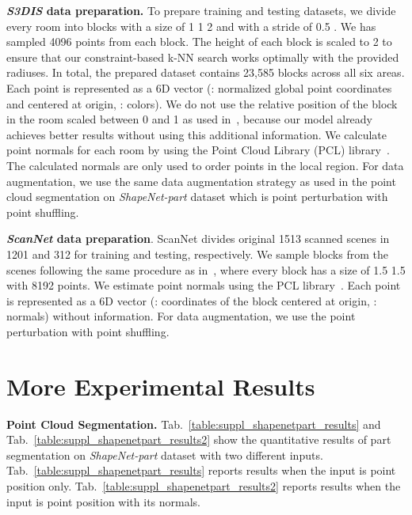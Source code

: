 \documentclass[10pt,twocolumn,letterpaper]{article}
\begin{document}
\textbf{\emph{S3DIS} data preparation.} To prepare training and testing datasets, we divide every room into blocks with a size of 1   1   2  and with a stride of 0.5 . We has sampled 4096 points from each block. The height of each block is scaled to 2  to ensure that our constraint-based k-NN search works optimally with the provided radiuses. In total, the prepared dataset contains 23,585 blocks across all six areas. Each point is represented as a 6D vector (: normalized global point coordinates and centered at origin, : colors). We do not use the relative position of the block in the room scaled between 0 and 1 as used in~\cite{qi2017pointnet}, because our model already achieves better results without using this additional information. We calculate point normals for each room by using the Point Cloud Library (PCL) library~\cite{rusu20113d}. The calculated normals are only used to order points in the local region. For data augmentation, we use the same data augmentation strategy as used in the point cloud segmentation on \emph{ShapeNet-part} dataset which is point perturbation with point shuffling.

\textbf{\emph{ScanNet} data preparation}. ScanNet divides original 1513 scanned scenes in 1201 and 312 for training and testing, respectively. We sample blocks from the scenes following the same procedure as in~\cite{qi2017pointnet++}, where every block has a size of 1.5   1.5  with 8192 points. We estimate point normals using the PCL library~\cite{rusu20113d}. Each point is represented as a 6D vector (: coordinates of the block centered at origin, : normals) without  information. For data augmentation, we use the point perturbation with point shuffling.

\section{More Experimental Results}
\label{sec:suppl_more_experimental_results} 
\textbf{Point Cloud Segmentation. }Tab.~\ref{table:suppl_shapenetpart_results} and Tab.~\ref{table:suppl_shapenetpart_results2} show the quantitative results of part segmentation on \emph{ShapeNet-part} dataset with two different inputs. Tab.~\ref{table:suppl_shapenetpart_results} reports results when the input is point position only. Tab.~\ref{table:suppl_shapenetpart_results2} reports results when the input is point position with its normals.
\end{document}
